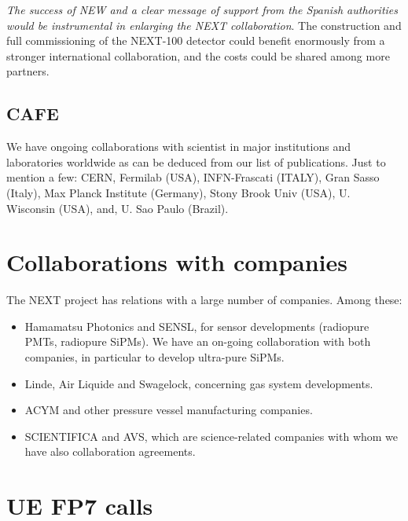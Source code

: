 \documentclass[a4paper,11pt,oneside]{article}
\begin{document}
{\em The success of NEW and a clear message of support from the Spanish authorities would be instrumental in enlarging the NEXT collaboration}. The construction and full commissioning of the NEXT-100 detector could benefit enormously from a stronger international collaboration, and the costs could be shared among more partners. 

\subsection*{CAFE}

We have ongoing collaborations with scientist in major institutions
and laboratories worldwide as can be deduced from our list
of publications. Just to mention a few: CERN, Fermilab (USA), 
INFN-Frascati (ITALY), Gran Sasso (Italy), Max Planck Institute (Germany),
Stony Brook Univ (USA), U. Wisconsin (USA), and, U. Sao Paulo (Brazil). 

\section{\bf \textsf{Collaborations with companies}}

The NEXT project has relations with a large number of companies. Among these:
\begin{itemize}
\item Hamamatsu Photonics and SENSL, for sensor developments (radiopure PMTs, radiopure SiPMs). We have an on-going collaboration with both companies, in particular to develop ultra-pure SiPMs.
\item Linde, Air Liquide and Swagelock, concerning gas system developments. 
\item ACYM and other pressure vessel manufacturing companies. 
\item SCIENTIFICA and AVS, which are science-related companies with whom we have also collaboration agreements. 
\end{itemize}


\section{\bf \textsf{UE FP7 calls}}
\label{sec.fp7}
\end{document}
